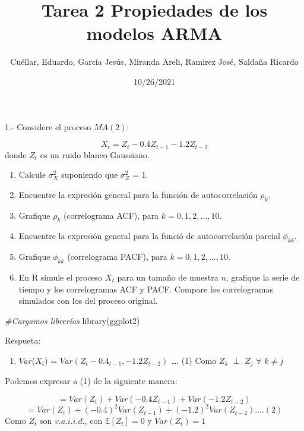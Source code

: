 \documentclass[
]{article}
\title{Tarea 2 Propiedades de los modelos ARMA}
\author{Cuéllar, Eduardo, García Jesús, Miranda Areli, Ramirez José,
Saldaña Ricardo}
\date{10/26/2021}
\newenvironment{Shaded}{\begin{snugshade}}{\end{snugshade}}
\newcommand{\CommentTok}[1]{\textcolor[rgb]{0.56,0.35,0.01}{\textit{#1}}}
\newcommand{\FunctionTok}[1]{\textcolor[rgb]{0.00,0.00,0.00}{#1}}
\newcommand{\NormalTok}[1]{#1}
\providecommand{\tightlist}{%
  \setlength{\itemsep}{0pt}\setlength{\parskip}{0pt}}
\begin{document}
\maketitle

1.- Considere el proceso \(MA(2)\):

\[ X_t = Z_t - 0.4Z_{t-1} - 1.2Z_{t-2} \] donde \({Z_{t}}\) es un ruido
blanco Gaussiano.

\begin{enumerate}
\def\labelenumi{(\alph{enumi})}
\tightlist
\item
  Calcule \(\sigma^{2}_{X}\) suponiendo que \(\sigma^{2}_{Z}\) = 1.
\item
  Encuentre la expresión general para la función de autocorrelación
  \(\rho_{k}\).
\item
  Grafique \(\rho_{k}\) (correlograma ACF), para \(k= 0,1,2,...,10\).
\item
  Encuentre la expresión general para la funció de autocorrelación
  parcial \(\phi_{kk}\).
\item
  Grafique \(\phi_{kk}\) (correlograma PACF), para \(k = 0,1,2,...,10\).
\item
  En R simule el proceso \({X_{t}}\) para un tamaño de muestra \(n\),
  grafique la serie de tiempo y los correlogramas ACF y PACF. Compare
  los correlogramas simulados con los del proceso original.
\end{enumerate}

\begin{Shaded}
\begin{Highlighting}[]
\CommentTok{\#Cargamos librerías}
\FunctionTok{library}\NormalTok{(ggplot2)}
\end{Highlighting}
\end{Shaded}

Respueta:

\begin{enumerate}
\def\labelenumi{\alph{enumi})}
\tightlist
\item
  \(Var\)(\(X_{t}\)) = \(Var(Z_{t} - 0.4_{t-1}, - 1.2Z_{t-2})\) \ldots.
  (1) Como \(Z_{k}\) \(\perp\) \(Z_{j}\) \(\forall\) \(k \ne j\)
\end{enumerate}

Podemos expresar a (1) de la siguiente manera:

\[ = Var(Z_{t}) + Var(-0.4 Z_{t-1}) + Var(-1.2Z_{t-2}) \]
\[ =  Var(Z_{t}) + (-0.4)^{2} Var(Z_{t-1}) + (-1.2)^{2} Var(Z_{t-2}) .... (2)\]
Como \(Z_{t}\) son \(v.a.i.i.d.\), con \(\mathbb{E}[Z_{t}] = 0\) y
\(Var(Z_{t}) = 1\)
\end{document}
